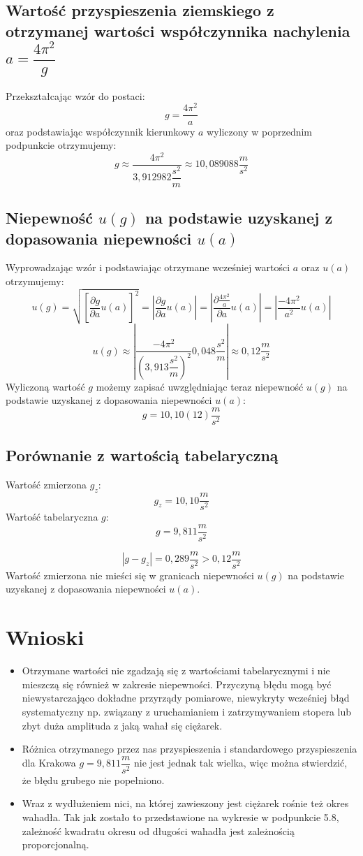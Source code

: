 \documentclass[a4paper,11pt]{article}
\begin{document}
\subsection{Wartość przyspieszenia ziemskiego z otrzymanej wartości współczynnika nachylenia $a =\dfrac{4\pi^{2}}{g}$}
Przekształcając wzór do postaci:
$$g = \dfrac{4\pi^{2}}{a}$$
oraz podstawiając współczynnik kierunkowy $a$ wyliczony w poprzednim podpunkcie otrzymujemy:
$$g \approx \dfrac{4\pi^{2}}{3,912982\dfrac{s^{2}}{m}} \approx 10,089088\dfrac{m}{s^{2}}$$

\subsection{Niepewność $u(g)$ na podstawie uzyskanej z dopasowania niepewności $u(a)$}
Wyprowadzając wzór i podstawiając otrzymane wcześniej wartości $a$ oraz $u(a)$ otrzymujemy: 
$$u(g)=\sqrt{\left[\frac{\partial g}{\partial a}u(a)\right]^{2}}=\left|\frac{\partial g}{\partial a}u(a)\right|=\left|\frac{\partial\frac{4\pi^{2}}{a}}{\partial a}u(a)\right|=\left|\frac{-4\pi^{2}}{a^{2}}u(a)\right|$$
$$u(g)\approx\left|\frac{-4\pi^{2}}{ \left(3,913 \dfrac{s^{2}}{m}\right)^{2}}0,048 \dfrac{s^{2}}{m}\right| \approx 0,12\dfrac{m}{s^{2}}$$
Wyliczoną wartość $g$ możemy zapisać uwzględniając teraz niepewność $u(g)$ na podstawie uzyskanej z dopasowania niepewności $u(a)$:
$$g=10,10(12)\dfrac{m}{s^{2}}$$

\subsection{Porównanie z wartością tabelaryczną}
Wartość zmierzona $g_{z}$:
$$g_{z}= 10,10\dfrac{m}{s^{2}}$$
Wartość tabelaryczna $g$:
$$g= 9,811\dfrac{m}{s^{2}}$$

$$|g-g_{z}|=0,289\dfrac{m}{s^{2}}> 0,12\dfrac{m}{s^{2}}$$
Wartość zmierzona nie mieści się w granicach niepewności $u(g)$ na podstawie uzyskanej z dopasowania niepewności $u(a)$.

\section{Wnioski}
\begin{itemize}
\item Otrzymane wartości nie zgadzają się z wartościami tabelarycznymi i nie mieszczą się również w zakresie niepewności. Przyczyną błędu mogą być niewystarczająco dokładne przyrządy pomiarowe, niewykryty wcześniej błąd systematyczny np. związany z uruchamianiem i zatrzymywaniem stopera lub zbyt duża amplituda z jaką wahał się ciężarek.  
\item Różnica otrzymanego przez nas przyspieszenia i standardowego przyspieszenia dla Krakowa $g=9,811\dfrac{m}{s^{2}}$ nie jest jednak tak wielka, więc można stwierdzić, że błędu grubego nie popełniono.
\item Wraz z wydłużeniem nici, na której zawieszony jest ciężarek rośnie też okres wahadła. Tak jak zostało to przedstawione na wykresie w podpunkcie 5.8, zależność kwadratu okresu od długości wahadła jest zależnością proporcjonalną.
\end{itemize}
\end{document}
